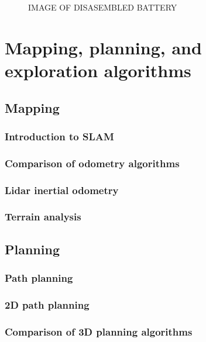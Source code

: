 \documentclass[11pt]{article}
\begin{document}
            \begin{figure}[H]
                \centering
                IMAGE OF DISASEMBLED BATTERY
            \end{figure}

        \newpage

    \section{Mapping, planning, and exploration algorithms}

        \subsection{Mapping}
            \subsubsection{Introduction to SLAM}
            \subsubsection{Comparison of odometry algorithms}
            \subsubsection{Lidar inertial odometry}
            \subsubsection{Terrain analysis}
        \subsection{Planning}
            \subsubsection{Path planning}
            \subsubsection{2D path planning}
            \subsubsection{Comparison of 3D planning algorithms}
\end{document}
